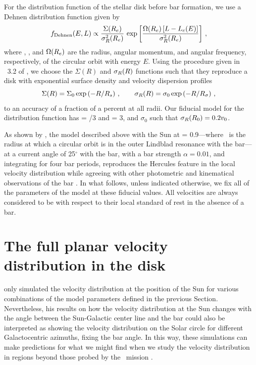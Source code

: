 For the distribution function of the stellar disk before bar
formation, we use a Dehnen distribution function \citep{dehnen99b}
given by
\begin{equation}\label{eq:fdehnen}
f_{\text{Dehnen}}(E,L) \propto \frac{\Sigma(R_e)}{\sigma_R^2(R_e)} \, \exp\left[ \frac{\Omega(R_e)\left[L-L_c(E)\right]}{\sigma_R^2(R_e)}\right]\,,
\end{equation}
where \rE, \Lc, and $\Omega(R_e)$ are the radius, angular momentum,
and angular frequency, respectively, of the circular orbit with energy
$E$. Using the procedure given in \sectionname~3.2 of
\citet{dehnen99b}, we choose the $\Sigma(R)$ and $\sigma_R(R)$
functions such that they reproduce a disk with exponential surface
density and velocity dispersion profiles
\begin{equation}
\Sigma(R) = \Sigma_0 \exp\left(-R/R_s\right)\,, \qquad 
\sigma_R(R) = \sigma_0 \exp\left(-R/R_{\sigma}\right)\,,
\end{equation}
to an accuracy of a fraction of a percent at all radii. Our fiducial
model for the distribution function has \Rs = \Ro /3 and \Rsigma =
3\Rs, and $\sigma_0$ such that $\sigma_R(R_0) = 0.2 v_0$.

As shown by \citet{dehnen99c,dehnen00a}, the model described above
with the Sun at \Ro = 0.9\Rolr---where \Rolr\ is the radius at which a
circular orbit is in the outer Lindblad resonance with the bar---at a
current angle of 25$^{\circ}$ with the bar, with a bar strength
$\alpha = 0.01$, and integrating for four bar periods, reproduces the
Hercules feature in the local velocity distribution while agreeing
with other photometric and kinematical observations of the bar
\citep[\eg,][]{binney97a,bissantz02a,cole02a,Shen10a}. In what
follows, unless indicated otherwise, we fix all of the parameters of
the model at these fiducial values. All velocities are always
considered to be with respect to their local standard of rest in the
absence of a bar.

\section{The full planar velocity distribution in the disk}\label{sec:2d}

\citet{dehnen00a} only simulated the velocity distribution at the
position of the Sun for various combinations of the model parameters
defined in the previous Section. Nevertheless, his results on how the
velocity distribution at the Sun changes with the angle between the
Sun-Galactic center line and the bar could also be interpreted as
showing the velocity distribution on the Solar circle for different
Galactocentric azimuths, fixing the bar angle. In this way, these
simulations can make predictions for what we might find when we study
the velocity distribution in regions beyond those probed by the
\hipparcos\ mission \citep{ESA97a}.

